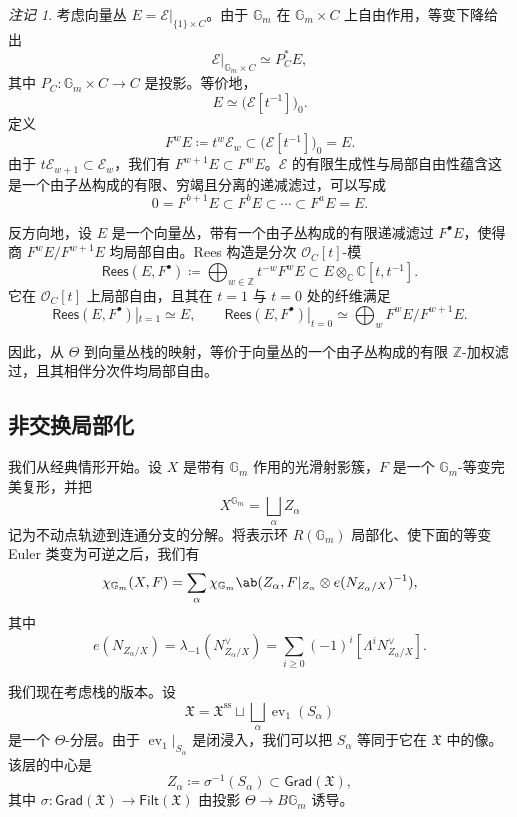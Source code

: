 \documentclass{amsart}
\theoremstyle{definition}
\theoremstyle{remark}
\newtheorem{rmk}[thm]{注记}
\theoremstyle{plain}
\theoremstyle{definition}
\theoremstyle{remark}
\newcommand{\G}{\mathbb{G}}
\newcommand{\C}{\mathbb{C}}
\newcommand{\Z}{\mathbb{Z}}
\newcommand{\mc}[1]{\mathcal{#1}}
\newcommand{\mf}[1]{\mathfrak{#1}}
\newcommand{\mr}[1]{\mathrm{#1}}
\newcommand{\ms}[1]{\mathsf{#1}}
\newcommand{\1}{\mathbf{1}}
\newcommand{\2}{\mathbf{2}}
\newcommand{\3}{\mathbf{3}}
\DeclareMathOperator{\ev}{ev}
\begin{document}
\begin{rmk}
    考虑向量丛 \(E=\mc{E}|_{\{1\}\times C}\)。由于 \(\G_m\) 在 \(\G_m\times C\) 上自由作用，等变下降给出
    \[
        \mc{E}|_{\G_m\times C}\simeq P_C^*E,
    \]
    其中 \(P_C\colon\G_m\times C\to C\) 是投影。等价地，
    \[
        E\simeq\big(\mc{E}[t^{-1}]\big)_0.
    \]
    定义
    \[
        F^wE\coloneqq t^w\mc{E}_w\subset\big(\mc{E}[t^{-1}]\big)_0=E.
    \]
    由于 \(t\mc{E}_{w+1}\subset\mc{E}_w\)，我们有 \(F^{w+1}E\subset F^wE\)。\(\mc{E}\) 的有限生成性与局部自由性蕴含这是一个由子丛构成的有限、穷竭且分离的递减滤过，可以写成
    \[
        0=F^{b+1}E\subset F^bE\subset\cdots\subset F^aE=E.
    \]

    反方向地，设 \(E\) 是一个向量丛，带有一个由子丛构成的有限递减滤过 \(F^\bullet E\)，使得商 \(F^wE/F^{w+1}E\) 均局部自由。Rees 构造是分次 \(\mc{O}_C[t]\)-模
    \[
        \ms{Rees}(E,F^\bullet)
        \coloneqq
        \bigoplus_{w\in\Z}t^{-w}F^wE
        \subset
        E\otimes_{\C}\C[t,t^{-1}].
    \]
    它在 \(\mc{O}_C[t]\) 上局部自由，且其在 \(t=1\) 与 \(t=0\) 处的纤维满足
    \[
        \ms{Rees}(E,F^\bullet)|_{t=1}\simeq E,
        \qquad
        \ms{Rees}(E,F^\bullet)|_{t=0}
        \simeq
        \bigoplus_w F^wE/F^{w+1}E.
    \]
\end{rmk}

因此，从 \(\Theta\) 到向量丛栈的映射，等价于向量丛的一个由子丛构成的有限 \(\Z\)-加权滤过，且其相伴分次件均局部自由。


\subsection{非交换局部化}%
\label{sub:Non-abelian localization}

我们从经典情形开始。设 \(X\) 是带有 \(\G_m\) 作用的光滑射影簇，\(F\) 是一个 \(\G_m\)-等变完美复形，并把
\[
    X^{\G_m}=\bigsqcup_\alpha Z_\alpha
\]
记为不动点轨迹到连通分支的分解。将表示环 \(R(\G_m)\) 局部化、使下面的等变 Euler 类变为可逆之后，我们有
\[
    \chi_{\G_m}(X,F)
    =
    \sum_\alpha
    \chi_{\G_m}\ab(
        Z_\alpha,
        F|_{Z_\alpha}\otimes e(N_{Z_\alpha/X})^{-1}
    ),
\]
其中
\[
    e(N_{Z_\alpha/X})
    =
    \lambda_{-1}(N_{Z_\alpha/X}^\vee)
    =
    \sum_{i\geq0}(-1)^i[\Lambda^iN_{Z_\alpha/X}^\vee].
\]

我们现在考虑栈的版本。设
\[
    \mf{X}
    =
    \mf{X}^{\mr{ss}}
    \sqcup
    \bigsqcup_\alpha\ev_1(S_\alpha)
\]
是一个 \(\Theta\)-分层。由于 \(\ev_1|_{S_\alpha}\) 是闭浸入，我们可以把 \(S_\alpha\) 等同于它在 \(\mf{X}\) 中的像。该层的中心是
\[
    Z_\alpha\coloneqq\sigma^{-1}(S_\alpha)\subset\ms{Grad}(\mf{X}),
\]
其中 \(\sigma\colon\ms{Grad}(\mf{X})\to\ms{Filt}(\mf{X})\) 由投影 \(\Theta\to B\G_m\) 诱导。
\end{document}
